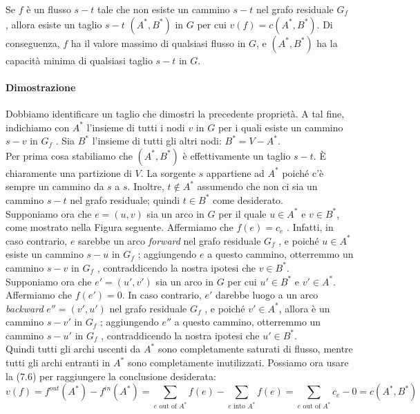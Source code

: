 \begin{myblockquote}
Se $f$ è un flusso $s-t$ tale che non esiste un cammino $s-t$ nel
grafo residuale $G_f$ , allora esiste un taglio $s-t$
$(A^{*} , B^{*})$ in $G$ per cui $v(f) = c(A^{*} , B^{*})$. Di
conseguenza, $f$ ha il valore massimo di qualsiasi flusso in $G$, e
$(A^{*} , B^{*})$ ha la capacità minima di qualsiasi taglio $s-t$ in
$G$.
\end{myblockquote}


\paragraph{Dimostrazione}

Dobbiamo identificare un taglio che dimostri la precedente proprietà. A
tal fine, indichiamo con $A^{*}$ l'insieme di tutti i nodi $v$ in
$G$ per i quali esiste un cammino $s-v$ in $G_f$ . Sia $B^{*}$
l'insieme di tutti gli altri nodi: $B^{*} = V - A^{*}$.\\

Per prima cosa stabiliamo che $(A^{*} , B^{*})$ è effettivamente un taglio
$s-t$. È chiaramente una partizione di $V$. La sorgente $s$
appartiene ad $A^{*}$ poiché c'è sempre un cammino da $s$ a $s$.
Inoltre, $t \notin A^{*}$ assumendo che non ci sia un cammino $s-t$
nel grafo residuale; quindi $t \in B^*$ come desiderato.\\

Supponiamo ora che $e = (u, v)$ sia un arco in $G$ per il quale
$u \in A^{*}$ e $v \in B^{*}$, come mostrato nella Figura seguente.
Affermiamo che $f(e) = c_e$ . Infatti, in caso contrario, $e$
sarebbe un arco \emph{forward} nel grafo residuale $G_f$ , e poiché
$u \in A^{*}$ esiste un cammino $s-u$ in $G_f$ ; aggiungendo $e$ a
questo cammino, otterremmo un cammino $s-v$ in $G_f$ ,
contraddicendo la nostra ipotesi che $v \in B^{*}$.\\

Supponiamo ora che $e' = (u' , v')$ sia un arco in $G$ per cui
$u' \in B^{*}$ e $v' \in A^{*}$. Affermiamo che $f(e') = 0$. In caso
contrario, $e'$ darebbe luogo a un arco \emph{backward}
$e'' = (v' , u')$ nel grafo residuale $G_f$ , e poiché
$v' \in A^{*}$, allora è un cammino $s-v'$ in $G_f$ ; aggiungendo
$e''$ a questo cammino, otterremmo un cammino $s-u'$ in $G_f$ ,
contraddicendo la nostra ipotesi che $u' \in B^{*}$.\\

Quindi tutti gli archi uscenti da $A^{*}$ sono completamente saturati di
flusso, mentre tutti gli archi entranti in $A^{*}$ sono completamente
inutilizzati. Possiamo ora usare la (7.6) per raggiungere la conclusione
desiderata:
$$
v(f) = f^{out}(A^{*}) - f^{in}(A^{*}) = \sum_{e \text{ out of }A^{*}} f(e) - \sum_{e \text{ into }A^{*}}f(e) = \sum_{e \text{ out of }A^{*}} c_e - 0 = c(A^{*}, B^{*})
$$

